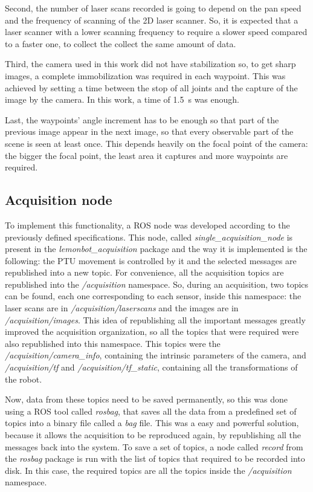 Second, the number of laser scans recorded is going to depend on the pan speed and the frequency of scanning of the 2D laser scanner. So, it is expected that a laser scanner with a lower scanning frequency to require a slower speed compared to a faster one, to collect the collect the same amount of data. 
                        
Third, the camera used in this work did not have stabilization so, to get sharp images, a complete immobilization was required in each waypoint. This was achieved by setting a time between the stop of all joints and the capture of the image by the camera. In this work, a time of \SI{1.5}{\second} was enough.
                        
Last, the waypoints' angle increment has to be enough so that part of the previous image appear in the next image, so that every observable part of the scene is seen at least once. This depends heavily on the focal point of the camera: the bigger the focal point, the least area it captures and more waypoints are required.

\subsection{Acquisition node}
\label{section:acquisition-node}


To implement this functionality, a ROS node was developed according to the previously defined specifications. This node, called \emph{single\_acquisition\_node} is present in the \emph{lemonbot\_acquisition} package and the way it is implemented is the following: the PTU movement is controlled by it and the selected messages are republished into a new topic. For convenience, all the acquisition topics are republished into the \emph{/acquisition} namespace. So, during an acquisition, two topics can be found, each one corresponding to each sensor, inside this namespace: the laser scans are in \emph{/acquisition/laserscans} and the images are in \emph{/acquisition/images}. This idea of republishing all the important messages greatly improved the acquisition organization, so all the topics that were required were also republished into this namespace. This topics were the \emph{/acquisition/camera\_info}, containing the intrinsic parameters of the camera, and \emph{/acquisition/tf} and \emph{/acquisition/tf\_static}, containing all the transformations of the robot.

Now, data from these topics need to be saved permanently, so this was done using a ROS tool called \emph{rosbag}, that saves all the data from a predefined set of topics into a binary file called a \emph{bag} file. This was a easy and powerful solution, because it allows the acquisition to be reproduced again, by republishing all the messages back into the system. To save a set of topics, a node called \emph{record} from the \emph{rosbag} package is run with the list of topics that required to be recorded into disk. In this case, the required topics are all the topics inside the \emph{/acquisition} namespace.

